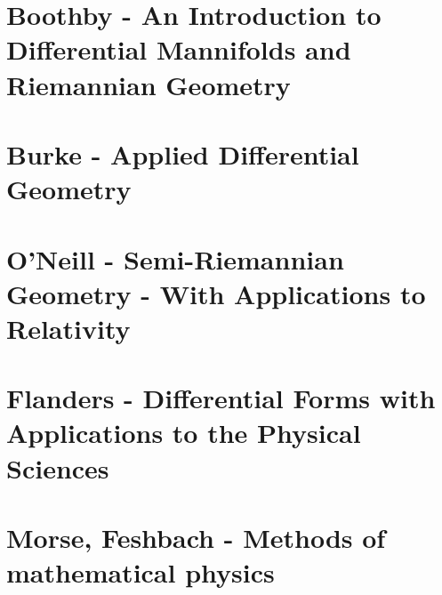 \documentclass[10pt,a4paper]{book}
\theoremstyle{definition}
\begin{document}
\section{{\sc Boothby} - An Introduction to Differential Mannifolds and Riemannian Geometry}

\section{{\sc Burke} - Applied Differential Geometry}

\section{{\sc O'Neill} - Semi-Riemannian Geometry - With Applications to Relativity}

\section{{\sc Flanders} - Differential Forms with Applications to the Physical Sciences}

\section{{\sc Morse, Feshbach} - Methods of mathematical physics}
\end{document}
